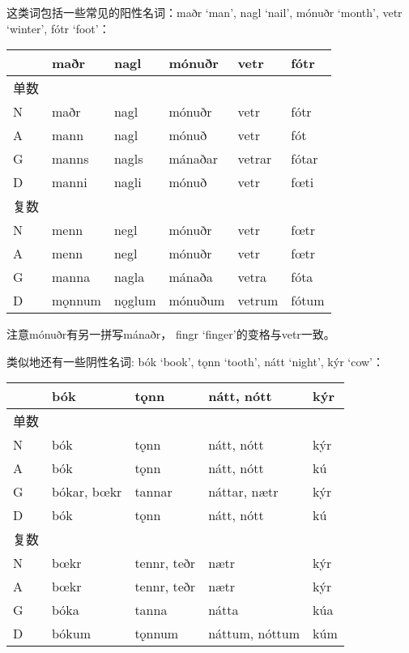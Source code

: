 这类词包括一些常见的阳性名词：maðr `man', nagl `nail', mónuðr `month',
vetr `winter', fótr `foot'：

\begin{longtable}{llllll}
  \toprule
     & maðr   & nagl   & mónuðr  & vetr   & fótr  \\
  \midrule
  \endhead
  \bottomrule
  \endfoot
  单数 &        &        &         &        &       \\
  N  & maðr   & nagl   & mónuðr  & vetr   & fótr  \\
  A  & mann   & nagl   & mónuð   & vetr   & fót   \\
  G  & manns  & nagls  & mánaðar & vetrar & fótar \\
  D  & manni  & nagli  & mónuð   & vetr   & fœti  \\
  复数 &        &        &         &        &       \\
  N  & menn   & negl   & mónuðr  & vetr   & fœtr  \\
  A  & menn   & negl   & mónuðr  & vetr   & fœtr  \\
  G  & manna  & nagla  & mánaða  & vetra  & fóta  \\
  D  & mǫnnum & nǫglum & mónuðum & vetrum & fótum \\
\end{longtable}

注意mónuðr有另一拼写mánaðr， fingr `finger‌'的变格与vetr一致。

类似地还有一些阴性名词: bók `book', tǫnn `tooth', nátt `night', kýr
`cow'：

\begin{longtable}{lllll}
  \toprule
     & bók         & tǫnn        & nátt, nótt     & kýr \\
  \midrule
  \endhead
  \bottomrule
  \endfoot
  单数 &             &             &                &     \\
  N  & bók         & tǫnn        & nátt, nótt     & kýr \\
  A  & bók         & tǫnn        & nátt, nótt     & kú  \\
  G  & bókar, bœkr & tannar      & náttar, nætr   & kýr \\
  D  & bók         & tǫnn        & nátt, nótt     & kú  \\
  复数 &             &             &                &     \\
  N  & bœkr        & tennr, teðr & nætr           & kýr \\
  A  & bœkr        & tennr, teðr & nætr           & kýr \\
  G  & bóka        & tanna       & nátta          & kúa \\
  D  & bókum       & tǫnnum      & náttum, nóttum & kúm \\
\end{longtable}

